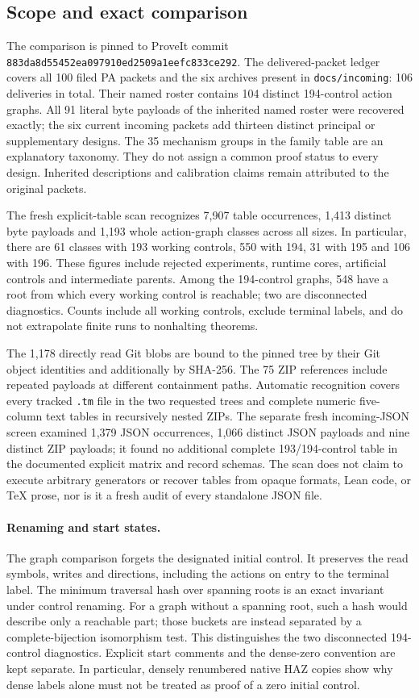\subsection{Scope and exact comparison}
The comparison is pinned to ProveIt commit
\texttt{883da8d55452ea097910ed2509a1eefc833ce292}.
The delivered-packet ledger covers all 100 filed PA packets and the six
archives present in \texttt{docs/incoming}: 106 deliveries in total.
Their named roster contains 104 distinct 194-control action graphs.
All 91 literal byte payloads of the inherited named roster were recovered
exactly; the six current incoming packets add thirteen distinct principal
or supplementary designs. The 35 mechanism groups in the family table
are an explanatory taxonomy. They do not assign a common proof status
to every design. Inherited descriptions and calibration claims remain
attributed to the original packets.

The fresh explicit-table scan recognizes 7,907 table occurrences, 1,413
distinct byte payloads and 1,193 whole action-graph classes across all
sizes. In particular, there are 61 classes with 193 working controls,
550 with 194, 31 with 195 and 106 with 196. These figures include rejected
experiments, runtime cores, artificial controls and intermediate parents.
Among the 194-control graphs, 548 have a root from which every working
control is reachable; two are disconnected diagnostics. Counts include
all working controls, exclude terminal labels, and do not extrapolate
finite runs to nonhalting theorems.

The 1,178 directly read Git blobs are bound to the pinned tree by their
Git object identities and additionally by SHA-256. The 75 ZIP references
include repeated payloads at different containment paths. Automatic
recognition covers every tracked \texttt{.tm} file in the two requested
trees and complete numeric five-column text tables in recursively nested
ZIPs. The separate fresh incoming-JSON screen examined 1,379 JSON
occurrences, 1,066 distinct JSON payloads and nine distinct ZIP payloads;
it found no additional complete 193/194-control table in the documented
explicit matrix and record schemas. The scan does not claim to execute
arbitrary generators or recover tables from opaque formats, Lean code,
or TeX prose, nor is it a fresh audit of every standalone JSON file.

\paragraph{Renaming and start states.}
The graph comparison forgets the designated initial control. It preserves
the read symbols, writes and directions, including the actions on entry
to the terminal label. The minimum traversal hash over spanning roots is
an exact invariant under control renaming. For a graph without a spanning
root, such a hash would describe only a reachable part; those buckets
are instead separated by a complete-bijection isomorphism test. This
distinguishes the two disconnected 194-control diagnostics.
Explicit start comments and the dense-zero convention are kept separate.
In particular, densely renumbered native HAZ copies show why dense labels
alone must not be treated as proof of a zero initial control.

